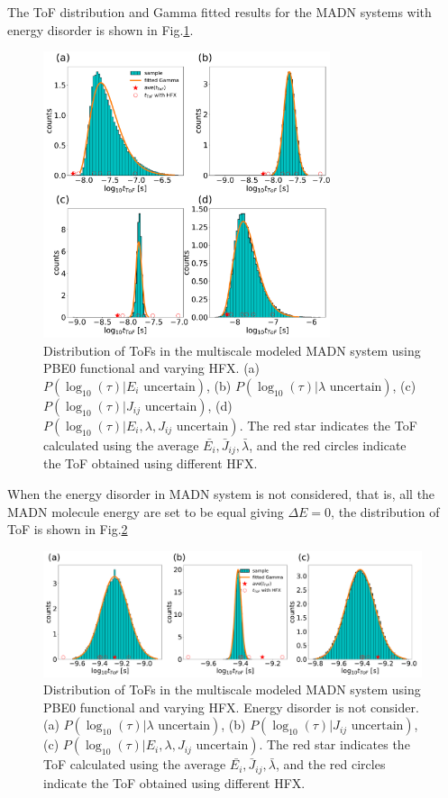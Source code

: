 \documentclass[letterpaper,12pt]{article}
\begin{document}
The ToF distribution and Gamma fitted results for the MADN systems with energy disorder is shown in Fig.\ref{fig:mle_MADN_withE}.
%
\begin{figure}[H]
    \centering
    \includegraphics[width=0.75\textwidth]{figs/MADN_HFX/fig_mle_MADN_withE.pdf}
    \caption{Distribution of ToFs in the multiscale modeled MADN system using PBE0 functional and varying HFX. 
    (a) $P(\log_{10}(\tau)|E_i \text{ uncertain})$, 
    (b) $P(\log_{10}(\tau)|\lambda \text{ uncertain})$, 
    (c) $P(\log_{10}(\tau)|J_{ij} \text{ uncertain})$, 
    (d) $P(\log_{10}(\tau)|E_i, \lambda, J_{ij} \text{ uncertain})$. The red star indicates the ToF calculated using the average $\bar{E_i}, \bar{J}_{ij}, \bar{\lambda}$, and the red circles indicate the ToF obtained using different HFX.}
    \label{fig:mle_MADN_withE}
\end{figure}
%

When the energy disorder in MADN system is not considered, that is, all the MADN molecule energy are set to be equal giving $\Delta E=0$, the distribution of ToF is shown in Fig.\ref{fig:mle_MADN_noE}
%
\begin{figure}[H]
    \centering
    \includegraphics[width=0.99\textwidth]{figs/MADN_HFX/fig_mle_MADN_noE.pdf}
    \caption{Distribution of ToFs in the multiscale modeled MADN system using PBE0 functional and varying HFX. Energy disorder is not consider. 
    (a) $P(\log_{10}(\tau)|\lambda \text{ uncertain})$, 
    (b) $P(\log_{10}(\tau)|J_{ij} \text{ uncertain})$, 
    (c) $P(\log_{10}(\tau)|E_i, \lambda, J_{ij} \text{ uncertain})$. The red star indicates the ToF calculated using the average $\bar{E_i}, \bar{J}_{ij}, \bar{\lambda}$, and the red circles indicate the ToF obtained using different HFX.}
    \label{fig:mle_MADN_noE}
\end{figure}
%
\end{document}
